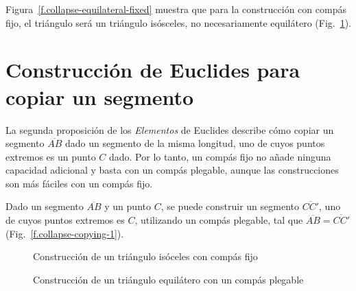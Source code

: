 Figura~\ref{f.collapse-equilateral-fixed} muestra que para la construcción con compás fijo, el triángulo será un triángulo isósceles, no necesariamente equilátero (Fig.~\ref{f.collapse-equilateral-collapse}).

\section{Construcción de Euclides para copiar un segmento}\label{s.collapse-copy}

La segunda proposición de los \textit{Elementos} de Euclides describe cómo copiar un segmento $\overline{AB}$ dado un segmento de la misma longitud, uno de cuyos puntos extremos es un punto $C$ dado. Por lo tanto, un compás fijo no añade ninguna capacidad adicional y basta con un compás plegable, aunque las construcciones son más fáciles con un compás fijo.

\begin{theorem}
Dado un segmento $\overline{AB}$ y un punto $C$, se puede construir un segmento $\overline{CC'}$, uno de cuyos puntos extremos es $C$, utilizando un compás plegable, tal que $\overline{AB}=\overline{CC'}$ (Fig.~\ref{f.collapse-copying-1}).
\end{theorem}

\begin{figure}[t]
\begin{minipage}{.45\textwidth}
\begin{center}
\caption{Construcción de un triángulo isóceles con compás fijo}\label{f.collapse-equilateral-fixed}
\end{center}
\end{minipage}
\hfill
\begin{minipage}{.45\textwidth}
\begin{center}
\caption{Construcción de un triángulo equilátero con un compás plegable}\label{f.collapse-equilateral-collapse}
\end{center}
\end{minipage}
\end{figure}

